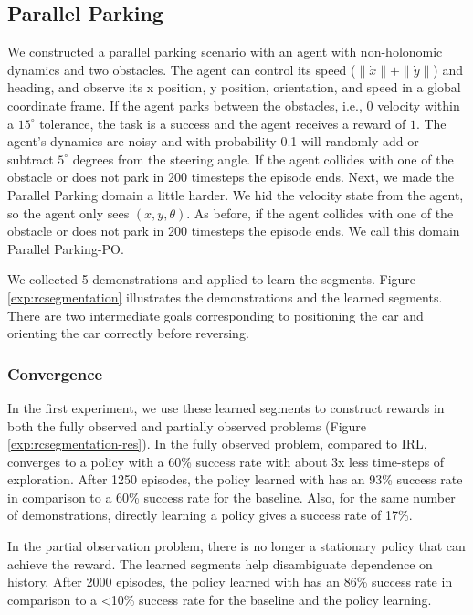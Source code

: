 \subsection{Parallel Parking}\label{exp:pp}
We constructed a parallel parking scenario with an agent with non-holonomic dynamics and two obstacles. The agent can control its speed ($\|\dot{x}\|+\|\dot{y}\|$) and heading, and observe its x position, y position, orientation, and speed in a global coordinate frame.
If the agent parks between the obstacles, i.e., 0 velocity within a $15^\circ$ tolerance, the task is a success and the agent receives a reward of $1$. 
The agent's dynamics are noisy and with probability 0.1 will randomly add or subtract $5^\circ$ degrees from the steering angle.
If the agent collides with one of the obstacle or does not park in 200 timesteps the episode ends.
Next, we made the  Parallel Parking domain a little harder. We hid the velocity state from the agent, so the agent only sees $(x,y,\theta)$. As before, if the agent collides with one of the obstacle or does not park in 200 timesteps the episode ends.
We call this domain Parallel Parking-PO.

We collected 5 demonstrations and applied \hirl to learn the segments.
Figure \ref{exp:rcsegmentation} illustrates the demonstrations and the learned segments. There are two intermediate goals corresponding to positioning the car and orienting the car correctly before reversing.

\subsubsection{Convergence}\label{exp:ppc} In the first experiment, we use these learned segments to construct rewards in both the fully observed and partially observed problems (Figure \ref{exp:rcsegmentation-res}). 
In the fully observed problem, compared to IRL, \hirl converges to a policy with a 60\% success rate with about 3x less time-steps of exploration.
After 1250 episodes, the policy learned with \hirl has an 93\% success rate in comparison to a 60\% success rate for the baseline.
Also, for the same number of demonstrations, directly learning a policy gives a success rate of 17\%.

In the partial observation problem, there is no longer a stationary policy that can achieve the reward.
The learned segments help disambiguate dependence on history.
After 2000 episodes, the policy learned with \hirl has an 86\% success rate in comparison to a <10\% success rate for the baseline and the policy learning.

